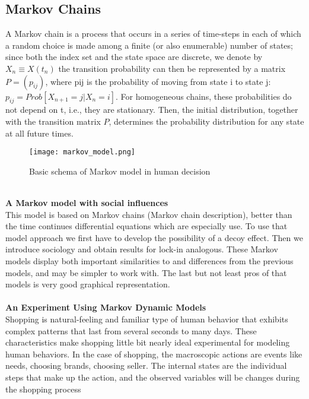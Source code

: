 \subsection{Markov Chains} \label{subsec:chain}
A Markov chain is a process that occurs in a series of time-steps in each of which a random choice is made
among a finite (or also enumerable) number of states; since both the index set and the state space are discrete,
we denote by $X_n≡X(t_n)$ the transition probability can then be represented by a matrix $P=(p_{ij})$, where pij is
the probability of moving from state i to state j: $p_{ij}=Prob[X_{n+1}=j|X_n=i]$. For homogeneous chains, these
probabilities do not depend on t, i.e., they are stationary. Then, the initial distribution, together with the
transition matrix $P$, determines the probability distribution for any state at all future times.\\
\begin{figure}[h!]
	\begin{center}
		\texttt{[image: markov\_model.png]}
	\end{center}
	\caption{Basic schema of Markov model in human decision}
	\label{Markov model}
\end{figure}
\\
\textbf{A Markov model with social influences} \label{subsec:markov}\\
This model is based on Markov chains (Markov chain description), better than the time continues differential
equations which are especially use.
To use that model approach we first have to develop the possibility of a decoy effect.
Then we introduce sociology and obtain results for lock-in analogous.
These Markov models display both important similarities to and differences from the previous models, and may be simpler to work with.
The last but not least pros of that models is very good graphical representation.\\
\\
\textbf{An Experiment Using Markov Dynamic Models} \label{subsec:markov_dynamic}\\
Shopping is natural-feeling and familiar type of human behavior that exhibits complex patterns that last from several
seconds to many days.
These characteristics make shopping little bit nearly ideal experimental for modeling human behaviors.
In the case of shopping, the macroscopic actions are events like needs, choosing brands, choosing seller.
The internal states are the individual steps that make up the action, and the observed variables will be changes during the shopping process
